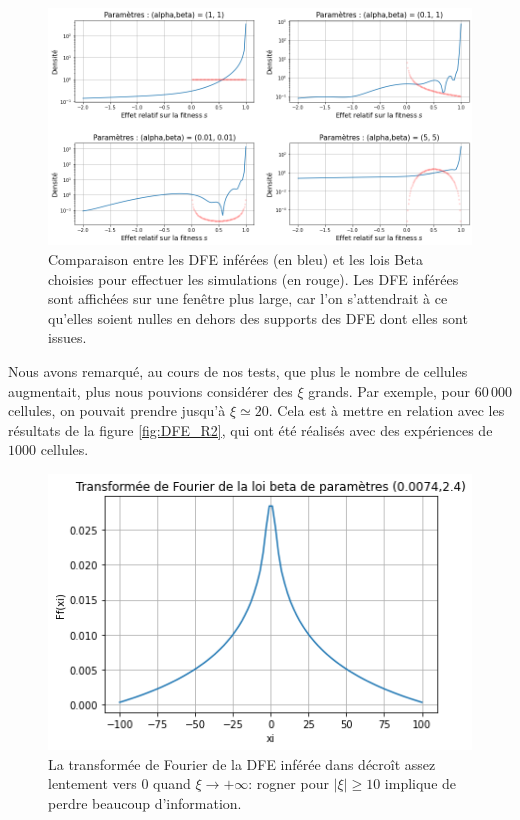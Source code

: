 \documentclass[12pt]{article}
\newcommand{\abs}[1]{\left|#1\right|}
\begin{document}
\begin{figure}[h]
  \begin{center}
    \includegraphics[width=0.8\linewidth]{../Img/DFE_inferred.png}
  \end{center}
  \caption{\label{fig:DFE}Comparaison entre les DFE inférées (en bleu) et les lois Beta choisies pour effectuer les simulations (en rouge). Les DFE inférées sont affichées sur une fenêtre plus large, car l'on s'attendrait à ce qu'elles soient nulles en dehors des supports des DFE dont elles sont issues.}
\end{figure}

Nous avons remarqué, au cours de nos tests, que plus le nombre de cellules augmentait, plus nous pouvions considérer des $\xi$ grands. Par exemple, pour $60\,000$ cellules, on pouvait prendre jusqu'à $\xi\simeq 20$. Cela est à mettre en relation avec les résultats de la figure \ref{fig:DFE_R2}, qui ont été réalisés avec des expériences de $1000$ cellules. 


\begin{figure}[h]
  \begin{center}
    \includegraphics[scale=0.6]{./img/four_DFE.png}
  \end{center}
  \caption{\label{fig:DFE_four}La transformée de Fourier de la DFE inférée dans \cite{rob} décroît assez lentement vers $0$ quand $\xi\to+\infty$: rogner pour $\abs{\xi}\geqslant 10$ implique de perdre beaucoup d'information.}
\end{figure}
\end{document}
